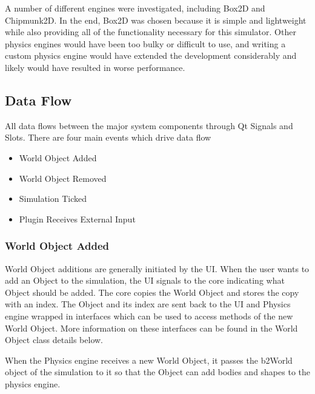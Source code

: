  	A number of different engines were investigated, including Box2D and Chipmunk2D. In the end, Box2D was chosen because it is simple and lightweight while also providing all of the functionality necessary for this simulator. Other physics engines would have been too bulky or difficult to use, and writing a custom physics engine would have extended the development considerably and likely would have resulted in worse performance.
 
 

 
 \subsection{Data Flow}
 All data flows between the major system components through Qt Signals and Slots. There are four main events which drive data flow
 \begin{itemize}
 	\item World Object Added
 	\item World Object Removed
 	\item Simulation Ticked
 	\item Plugin Receives External Input
 \end{itemize}
 
 \subsubsection{World Object Added}
 	World Object additions are generally initiated by the UI. When the user wants to add an Object to the simulation, the UI signals to the core indicating what Object should be added. The core copies the World Object and stores the copy with an index. The Object and its index are sent back to the UI and Physics engine wrapped in interfaces which can be used to access methods of the new World Object. More information on these interfaces can be found in the World Object class details below.
 	
 	When the Physics engine receives a new World Object, it passes the b2World object
of the simulation to it so that the Object can add bodies and shapes to the physics engine.

